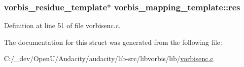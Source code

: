\subsubsection[{\texorpdfstring{res}{res}}]{ {\bf vorbis\+\_\+residue\+\_\+template}$\ast$ vorbis\+\_\+mapping\+\_\+template\+::res}\hypertarget{structvorbis__mapping__template_a93ca70f5c4a50d4d75c83cfb62a55327}{}\label{structvorbis__mapping__template_a93ca70f5c4a50d4d75c83cfb62a55327}


Definition at line 51 of file vorbisenc.\+c.



The documentation for this struct was generated from the following file\+:\begin{DoxyCompactItemize}
\item 
C\+:/\+\_\+dev/\+Open\+U/\+Audacity/audacity/lib-\/src/libvorbis/lib/\hyperlink{vorbisenc_8c}{vorbisenc.\+c}\end{DoxyCompactItemize}
